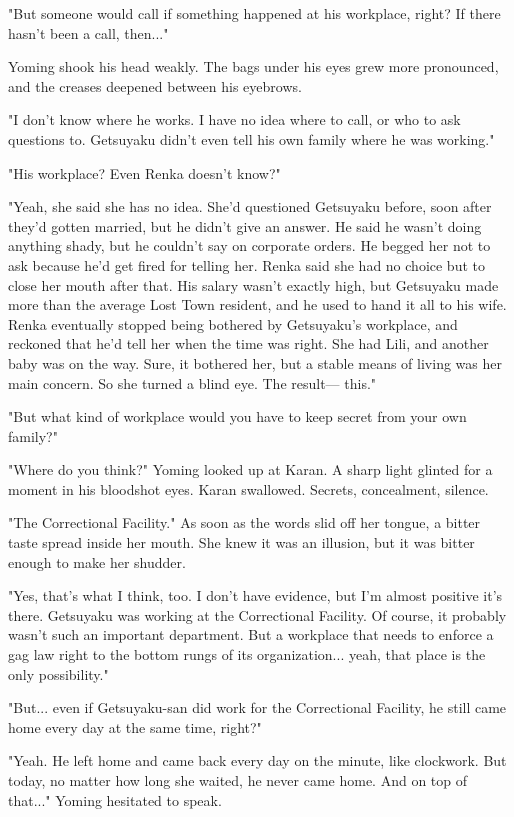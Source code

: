 "But someone would call if something happened at his workplace, right?
If there hasn't been a call, then..."

Yoming shook his head weakly. The bags under his eyes grew more
pronounced, and the creases deepened between his eyebrows.

"I don't know where he works. I have no idea where to call, or who to
ask questions to. Getsuyaku didn't even tell his own family where he was
working."

"His workplace? Even Renka doesn't know?"

"Yeah, she said she has no idea. She'd questioned Getsuyaku before, soon
after they'd gotten married, but he didn't give an answer. He said he
wasn't doing anything shady, but he couldn't say on corporate orders. He
begged her not to ask because he'd get fired for telling her. Renka said
she had no choice but to close her mouth after that. His salary wasn't
exactly high, but Getsuyaku made more than the average Lost Town
resident, and he used to hand it all to his wife. Renka eventually
stopped being bothered by Getsuyaku's workplace, and reckoned that he'd
tell her when the time was right. She had Lili, and another baby was on
the way. Sure, it bothered her, but a stable means of living was her
main concern. So she turned a blind eye. The result--- this."

"But what kind of workplace would you have to keep secret from your own
family?"

"Where do you think?" Yoming looked up at Karan. A sharp light glinted
for a moment in his bloodshot eyes. Karan swallowed. Secrets,
concealment, silence.

"The Correctional Facility." As soon as the words slid off her tongue, a
bitter taste spread inside her mouth. She knew it was an illusion, but
it was bitter enough to make her shudder.

"Yes, that's what I think, too. I don't have evidence, but I'm almost
positive it's there. Getsuyaku was working at the Correctional Facility.
Of course, it probably wasn't such an important department. But a
workplace that needs to enforce a gag law right to the bottom rungs of
its organization... yeah, that place is the only possibility."

"But... even if Getsuyaku-san did work for the Correctional Facility, he
still came home every day at the same time, right?"

"Yeah. He left home and came back every day on the minute, like
clockwork. But today, no matter how long she waited, he never came home.
And on top of that..." Yoming hesitated to speak.

